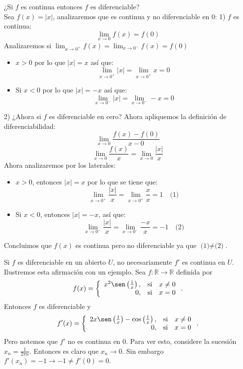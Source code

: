\begin{example}
    {¿Si $f$ es continua entonces $f$ es diferenciable?}\\
Sea $f(x) = |x|$, analizaremos que es continua y no diferenciable en $0$:
1) $f$ es continua:
\[\lim_{x \to 0} f(x) = f(0)\]
Analizaremos si $\lim_{x \to 0^+} f(x) = \lim_{x \to 0^-} f(x) = f(0)$
\begin{itemize}
    \item $x > 0$ por lo que $|x| = x$ así que:
    \[\lim_{x \to 0^+} |x| = \lim_{x \to 0^+} x = 0\]
    
    \item Si $x < 0$ por lo que $|x| = -x$ así que:
    \[\lim_{x \to 0^-} |x| = \lim_{x \to 0^-} -x = 0\]
\end{itemize}

2) ¿Ahora si $f$ es diferenciable en cero?
Ahora apliquemos la definición de diferenciabilidad:
\[\lim_{x \to 0} \frac{f(x) - f(0)}{x - 0}\]
\[\lim_{x \to 0} \frac{f(x)}{x} = \lim_{x \to 0} \frac{|x|}{x}\]
Ahora analizaremos por los laterales:
\begin{itemize}
    \item $x > 0$, entonces $|x| = x$ por lo que se tiene que:
    \[\lim_{x \to 0^+} \frac{|x|}{x} = \lim_{x \to 0^+} \frac{x}{x} = 1 \quad \text{(1)}\]
    
    \item Si $x < 0$, entonces $|x| = -x$, así que:
    \[\lim_{x \to 0^-} \frac{|x|}{x} = \lim_{x \to 0^-} \frac{-x}{x} = -1 \quad \text{(2)}\]
\end{itemize}
Concluimos que $f(x)$ es continua pero no diferenciable ya que $\text{(1)} \neq \text{(2)}$.

\end{example}
\begin{example}
 Si $f$ es diferenciable en un abierto $U$, no necesariamente $f'$ es continua en $U$. Ilustremos esta afirmación con un ejemplo. Sea $f:\mathbb{R} \to \mathbb{R}$ definida por 
 \[f(x)= \left\{ \begin{array}{rll}
    x^2\sen\left(\frac{1}{x}\right), & \text{si}  & x\neq 0  \\
    0, & \text{si} & x=0 
 \end{array}\right. .\]
Entonces $f$ es diferenciable y 
\[f'(x)= \left\{ \begin{array}{rll}
    2x\sen\left(\frac{1}{x}\right)-\cos\left(\frac{1}{x}\right), & \text{si}  & x\neq 0  \\
    0, & \text{si} & x=0 
 \end{array}\right. .\]
Pero notemos que $f'$ no es continua en $0$. Para ver esto, considere la sucesión $x_n=\frac{1}{2\pi n}$. Entonces es claro que $x_n \to 0$. Sin embargo $f'(x_n)=-1 \to -1 \neq f'(0)=0$.
\end{example}

